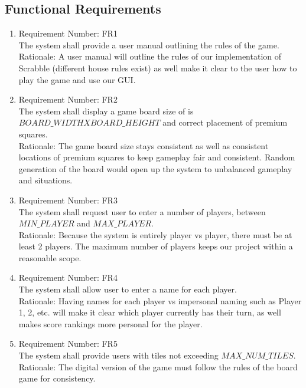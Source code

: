 \documentclass[12pt, titlepage]{article}
\begin{document}
\subsection{Functional Requirements}
\begin{enumerate} %
    \item 
    Requirement Number: FR1 \\
    The system shall provide a user manual outlining the rules of the game. \\
    Rationale: A user manual will outline the rules of our implementation of Scrabble (different house rules exist) as well make it clear to the user how to play the game and use our GUI.\\
    \item 
    Requirement Number: FR2 \\
    The system shall display a game board size of is $BOARD\_WIDTHXBOARD\_HEIGHT$ and correct placement of premium squares. \\
    Rationale: The game board size stays consistent as well as consistent locations of premium squares to keep gameplay fair and consistent. Random generation of the board would open up the system to unbalanced gameplay and situations.\\
    \item 
    Requirement Number: FR3 \\
    The system shall request user to enter a number of players, between $MIN\_PLAYER$ and $MAX\_PLAYER$. \\
    Rationale: Because the system is entirely player vs player, there must be at least 2 players. The maximum number of players keeps our project within a reasonable scope. \\
    \item
    Requirement Number: FR4 \\
    The system shall allow user to enter a name for each player. \\
    Rationale: Having names for each player vs impersonal naming such as Player 1, 2, etc. will make it clear which player currently has their turn, as well makes score rankings more personal for the player.\\
    \item 
    Requirement Number: FR5 \\ %
    The system shall provide users with tiles not exceeding $MAX\_NUM\_TILES$.\\
    Rationale: The digital version of the game must follow the rules of the board game for consistency.\\

\end{enumerate}
\end{document}
